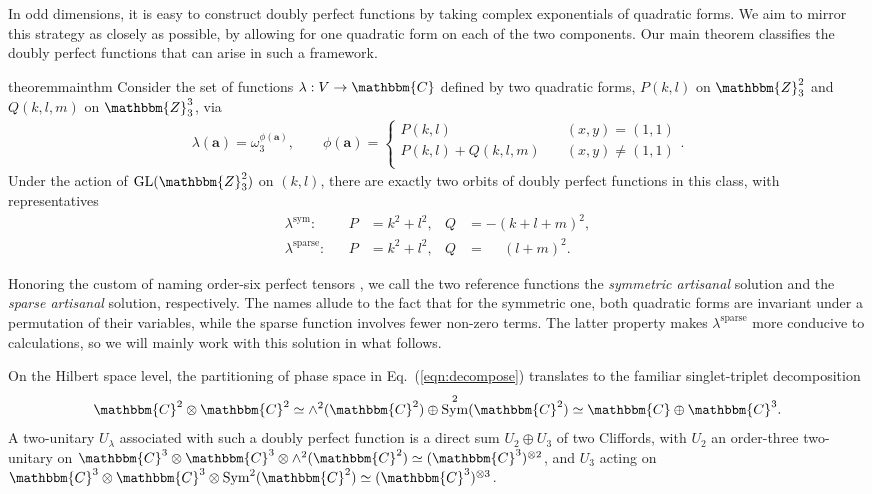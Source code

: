 \documentclass[aps,nofootinbib,floatfix,a4paper]{revtex4}
\newcommand{\sym}{^\mathrm{sym}}
\newcommand{\sparse}{^\mathrm{sparse}}
\newcommand{\1}{\mbox{$\mathbf{1}$}}
\def\ZZ{\mathbbm{Z}}
\def\CC{\mathbbm{C}}
\DeclareMathOperator{\GL}{GL}
\DeclareMathOperator{\Sym}{Sym}
\renewcommand{\vec}{\mathbf}
\begin{document}
In odd dimensions, it is easy to construct doubly perfect functions by taking complex exponentials of quadratic forms.
We aim to mirror this strategy as closely as possible, by allowing for one quadratic form on each of the two components.
Our main theorem classifies the doubly perfect functions that can arise in such a framework.

\begin{restatable}{theorem}{mainthm}\label{thm:main}
	Consider the set of functions $\lambda: V\to \CC$
	defined by two quadratic forms,
	$P(k,l)$ on $\ZZ_3^2$
	and $Q(k,l,m)$ on $\ZZ_3^3$,
	via
	\begin{align*}%
		\lambda(\vec a)
		=
		\omega_3^{\phi(\vec a)},
		\qquad
		\phi(\vec a)
		=
		\left\{
			\begin{array}{ll}
				P(k,l) \quad& (x,y)=(1,1) \\
				P(k,l) + Q(k,l,m) \quad& (x,y)\neq (1,1) \\
			\end{array}
		\right..
	\end{align*}
	Under the action of $\GL(\ZZ_3^2)$ on $(k,l)$, there are exactly two orbits of doubly perfect functions in this class, with representatives 
	\begin{align}
		\lambda\sym:& &P&=k^2+l^2, & Q& = -(k+l+m)^2,  \label{eqn:symmetric} \\
		\lambda\sparse:& &P&=k^2+l^2, & Q&=\phantom{-}(l+m)^2. \label{eqn:sparse}
	\end{align}
\end{restatable}

Honoring the custom of naming order-six perfect tensors \cite{rather2022thirty},
we call the two reference functions the \emph{symmetric artisanal} solution and the \emph{sparse artisanal} solution, respectively.
The names allude to the fact that for the symmetric one, both quadratic forms are invariant under a permutation of their variables, while the sparse function involves fewer non-zero terms.
The latter property makes $\lambda\sparse$ more conducive to calculations, so we will mainly work with this solution in what follows.

On the Hilbert space level, the partitioning of phase space in Eq.~(\ref{eqn:decompose}) translates to the familiar singlet-triplet decomposition 
\begin{align*}
	\CC^2\otimes \CC^2 \simeq \wedge^2(\CC^2) \oplus \Sym^2(\CC^2) \simeq \CC \oplus \CC^3.
\end{align*}
A two-unitary $U_{\lambda}$ associated with such a doubly perfect function
is a direct sum $U_{2}\oplus U_3$ of two Cliffords, with 
$U_2$ an order-three two-unitary on 
$\CC^3\otimes\CC^3\otimes\wedge^2(\CC^2) \simeq (\CC^3)^{\otimes 2}$,
and 
$U_3$ acting on 
$\CC^3\otimes\CC^3\otimes\Sym^2(\CC^2) \simeq (\CC^3)^{\otimes 3}$.
\end{document}
